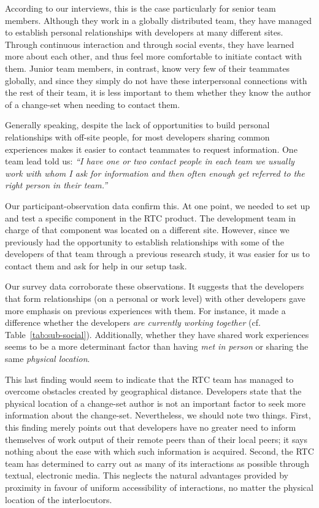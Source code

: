 According to our interviews, this is the case particularly for senior team members. Although they work in a globally distributed team, they have managed to establish personal relationships with developers at many different sites. Through continuous interaction and through social events, they have learned more about each other, and thus feel more comfortable to initiate contact with them. Junior team members, in contrast, know very few of their teammates globally, and since they simply do not have these interpersonal connections with the rest of their team, it is less important to them whether they know the author of a change-set when needing to contact them.

Generally speaking, despite the lack of opportunities to build personal relationships with off-site people, for most developers sharing common experiences makes it easier to contact teammates to request information. One team lead told us: \emph{``I have one or two contact people in each team we usually work with whom I ask for information and then often enough get referred to the right person in their team.''}

Our participant-observation data confirm this. At one point, we needed to set up and test a specific component in the RTC product. The development team in charge of that component was located on a different site. However, since we previously had the opportunity to establish relationships with some of the developers of that team through a previous research study, it was easier for us to contact them and ask for help in our setup task.

Our survey data corroborate these observations. It suggests that the developers that form relationships (on a personal or work level) with other developers gave more emphasis on previous experiences with them. For instance, it made a difference whether the developers \emph{are currently working together} (cf. Table~\ref{tab:sub-social}). Additionally, whether they have shared work experiences seems to be a more determinant factor than having \emph{met in person} or sharing the same \emph{physical location}.

This last finding would seem to indicate that the RTC team has managed to overcome obstacles created by geographical distance. Developers state that the physical location of a change-set author is not an important factor to seek more information about the change-set. Nevertheless, we should note two things. First, this finding merely points out that developers have no greater need to inform themselves of work output of their remote peers than of their local peers; it says nothing about the ease with which such information is acquired. Second, the RTC team has determined to carry out as many of its interactions as possible through textual, electronic media. This neglects the natural advantages provided by proximity in favour of uniform accessibility of interactions, no matter the physical location of the interlocutors.



